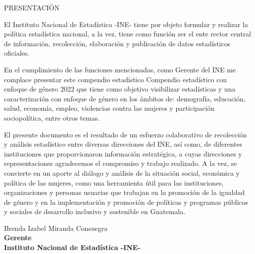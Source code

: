 \begin{center}
{\Bold \LARGE PRESENTACIÓN}\\[2cm]
\end{center}

El Instituto Nacional de Estadística -INE- tiene por objeto formular y realizar la política estadística nacional, a la vez, tiene como función ser el ente rector central de información, recolección, elaboración y publicación de datos estadísticos oficiales.  

En el cumplimiento de las funciones mencionadas, como Gerente del INE me complace presentar este compendio estadístico Compendio estadístico con enfoque de género 2022 que tiene como objetivo visibilizar estadísticas y una caracterización con enfoque de género en los ámbitos de: demografía, educación, salud, economía, empleo, violencias contra las mujeres y participación sociopolítica, entre otros temas. 

El presente documento es el resultado de un esfuerzo colaborativo de recolección y análisis estadístico entre diversas direcciones del INE, así como, de diferentes instituciones que proporcionaron información estratégica, a cuyas direcciones y representaciones agradecemos el compromiso y trabajo realizado. A la vez, se convierte en un aporte al diálogo y análisis de la situación social, económica y política de las mujeres, como una herramienta útil para las instituciones, organizaciones y personas usuarias que trabajan en la promoción de la igualdad de género y en la implementación y promoción de políticas y programas públicos y sociales de desarrollo inclusivo y sostenible en Guatemala.  

\begin{center}
Brenda Izabel Miranda Consuegra\\
\textbf{Gerente} \\
\textbf{Instituto Nacional de Estadística -INE- }
\end{center}

